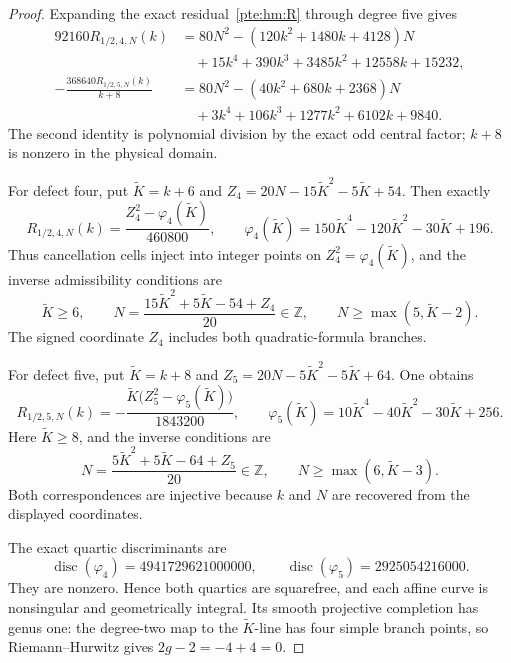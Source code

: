 \documentclass[11pt,a4paper]{article}
\numberwithin{equation}{section}
\theoremstyle{definition}
\theoremstyle{plain}
\begin{document}
\begin{proof}
Expanding the exact residual~\eqref{pte:hm:R} through degree five gives
\begin{align*}
 92160R_{1/2,4,N}(k)
 &=80N^2-(120k^2+1480k+4128)N\\
 &\quad+15k^4+390k^3+3485k^2+12558k+15232,\\
 -\frac{368640R_{1/2,5,N}(k)}{k+8}
 &=80N^2-(40k^2+680k+2368)N\\
 &\quad+3k^4+106k^3+1277k^2+6102k+9840.
\end{align*}
The second identity is polynomial division by the exact odd central factor; $k+8$ is nonzero in the physical domain.

For defect four, put $\widetilde K=k+6$ and $Z_4=20N-15\widetilde K^2-5\widetilde K+54$. Then exactly
\begin{equation}\label{pte:hm:quarticfour}
 R_{1/2,4,N}(k)=\frac{Z_4^2-\varphi_4(\widetilde K)}{460800},\qquad
 \varphi_4(\widetilde K)=150\widetilde K^4-120\widetilde K^2-30\widetilde K+196.
\end{equation}
Thus cancellation cells inject into integer points on $Z_4^2=\varphi_4(\widetilde K)$, and the inverse admissibility conditions are
\begin{equation}\label{pte:hm:admissfour}
 \widetilde K\ge6,\qquad N=\frac{15\widetilde K^2+5\widetilde K-54+Z_4}{20}\in\mathbb Z,
 \qquad N\ge\max(5,\widetilde K-2).
\end{equation}
The signed coordinate $Z_4$ includes both quadratic-formula branches.

For defect five, put $\widetilde K=k+8$ and $Z_5=20N-5\widetilde K^2-5\widetilde K+64$. One obtains
\begin{equation}\label{pte:hm:quarticfive}
 R_{1/2,5,N}(k)=-\frac{\widetilde K\bigl(Z_5^2-\varphi_5(\widetilde K)\bigr)}{1843200},\qquad
 \varphi_5(\widetilde K)=10\widetilde K^4-40\widetilde K^2-30\widetilde K+256.
\end{equation}
Here $\widetilde K\ge8$, and the inverse conditions are
\begin{equation}\label{pte:hm:admissfive}
 N=\frac{5\widetilde K^2+5\widetilde K-64+Z_5}{20}\in\mathbb Z,
 \qquad N\ge\max(6,\widetilde K-3).
\end{equation}
Both correspondences are injective because $k$ and $N$ are recovered from the displayed coordinates.

The exact quartic discriminants are
\[
 \operatorname{disc}(\varphi_4)=4941729621000000,\qquad
 \operatorname{disc}(\varphi_5)=2925054216000.
\]
They are nonzero. Hence both quartics are squarefree, and each affine curve is nonsingular and geometrically integral. Its smooth projective completion has genus one: the degree-two map to the $\widetilde K$-line has four simple branch points, so Riemann--Hurwitz gives $2g-2=-4+4=0$.


\end{proof}
\end{document}
